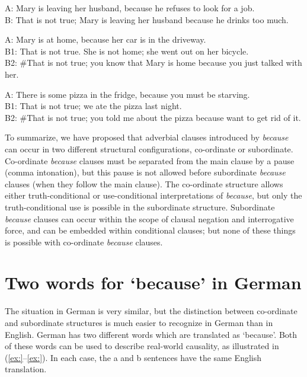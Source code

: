 \ea
A: Mary is leaving her husband, because he refuses to look for a job.\\
B: That is not true; Mary is leaving her husband because he drinks too much.
\z

\ea
A: Mary is at home, because her car is in the driveway.\\
B1: That is not true. She is not home; she went out on her bicycle.\\
B2: \#That is not true; you know that Mary is home because you just talked with her.
\z

\ea
A: There is some pizza in the fridge, because you must be starving.\\
B1: That is not true; we ate the pizza last night.\\
B2: \#That is not true; you told me about the pizza because want to get rid of it.
\z


To summarize, we have proposed that adverbial clauses introduced by \textit{because} can occur in two different structural configurations, co-ordinate or subordinate. Co-ordinate \textit{because} clauses must be separated from the main clause by a pause (comma intonation), but this pause is not allowed before subordinate \textit{because} clauses (when they follow the main clause). The co-ordinate structure allows either truth-conditional or use-conditional interpretations of \textit{because}, but only the truth-conditional use is possible in the subordinate structure. Subordinate \textit{because} clauses can occur within the scope of clausal negation and interrogative force, and can be embedded within conditional clauses; but none of these things is possible with co-ordinate \textit{because} clauses.


\section{Two words for ‘because’ in German}\footnotemark{}\label{sec:18.5}

The situation in German is very similar, but the distinction between co-ordinate and subordinate structures is much easier to recognize in German than in English. German has two different words which are translated as ‘because’. Both of these words can be used to describe real-world causality, as illustrated in (\ref{ex:}--\ref{ex:}). In each case, the a and b sentences have the same English translation.


